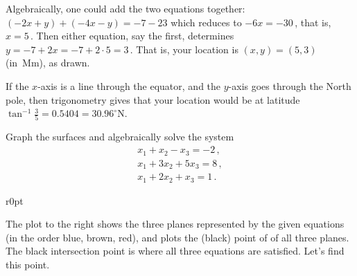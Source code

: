 \begin{example}
\begin{solution}
Algebraically, one could add the two equations together: \((-2x+y)+(-4x-y)=-7-23\) which reduces to \(-6x=-30\)\,, that is, \(x=5\)\,.
Then either equation, say the first, determines~\(y=-7+2x=-7+2\cdot 5=3\)\,.  
That is, your location is \((x,y)=(5,3)\) (in~Mm), as drawn.
\end{solution}

If the \(x\)-axis is a line through the equator, and the \(y\)-axis goes through the North pole, then trigonometry gives that your location would be at latitude
\(\tan^{-1}\frac35=0.5404=30.96^\circ\)N.
\end{example}





\begin{example} 
\label{eg:3eq3var}
Graph the surfaces and algebraically solve the system
\begin{equation*}
\begin{array}{l}
x_1+x_2-x_3=-2\,,\\
x_1+3x_2+5x_3=8\,,\\
x_1+2x_2+x_3=1\,.
\end{array}
\end{equation*}
\begin{wrapfigure}[8]r{0pt}
\end{wrapfigure}
\begin{solution} 
The plot to the right shows the three planes represented by the given equations (in the order blue, brown, red), and plots the (black) point of  of all three planes.
The black intersection point is where all three equations are satisfied.
Let's find this point.


\end{solution}
\end{example}
